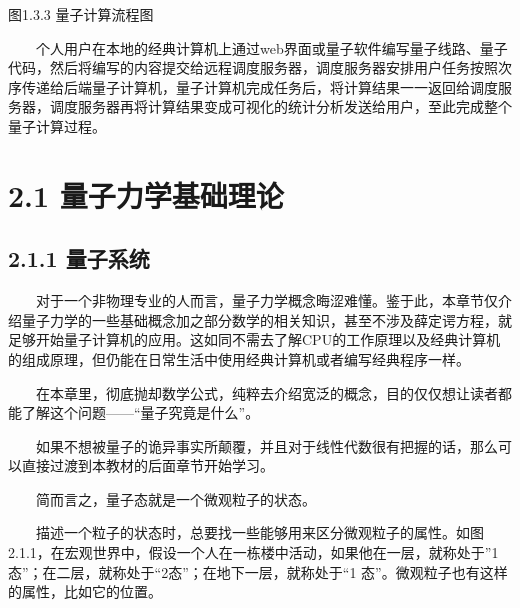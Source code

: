 \documentclass[a4paper,11pt,english]{sphinxmanual}
\begin{document}
\begin{center}图1.3.3 量子计算流程图
\end{center}
\sphinxAtStartPar
  个人用户在本地的经典计算机上通过web界面或量子软件编写量子线路、量子代码，然后将编写的内容提交给远程调度服务器，调度服务器安排用户任务按照次序传递给后端量子计算机，量子计算机完成任务后，将计算结果一一返回给调度服务器，调度服务器再将计算结果变成可视化的统计分析发送给用户，至此完成整个量子计算过程。

\sphinxstepscope


\section{2.1 量子力学基础理论}
\label{\detokenize{rst/2.1_u91cf_u5b50_u529b_u5b66_u7406_u8bba_u57fa_u7840:id1}}\label{\detokenize{rst/2.1_u91cf_u5b50_u529b_u5b66_u7406_u8bba_u57fa_u7840::doc}}

\subsection{2.1.1 量子系统}
\label{\detokenize{rst/2.1_u91cf_u5b50_u529b_u5b66_u7406_u8bba_u57fa_u7840:id2}}
\sphinxAtStartPar
  对于一个非物理专业的人而言，量子力学概念晦涩难懂。鉴于此，本章节仅介绍量子力学的一些基础概念加之部分数学的相关知识，甚至不涉及薛定谔方程，就足够开始量子计算机的应用。这如同不需去了解CPU的工作原理以及经典计算机的组成原理，但仍能在日常生活中使用经典计算机或者编写经典程序一样。

\sphinxAtStartPar
  在本章里，彻底抛却数学公式，纯粹去介绍宽泛的概念，目的仅仅想让读者都能了解这个问题——“量子究竟是什么”。

\sphinxAtStartPar
  如果不想被量子的诡异事实所颠覆，并且对于线性代数很有把握的话，那么可以直接过渡到本教材的后面章节开始学习。

\sphinxAtStartPar
{}

\sphinxAtStartPar
  简而言之，量子态就是一个微观粒子的状态。

\sphinxAtStartPar
  描述一个粒子的状态时，总要找一些能够用来区分微观粒子的属性。如图2.1.1，在宏观世界中，假设一个人在一栋楼中活动，如果他在一层，就称处于”1态”；在二层，就称处于“2态”；在地下一层，就称处于“\sphinxhyphen{}1 态”。微观粒子也有这样的属性，比如它的位置。

\end{document}
